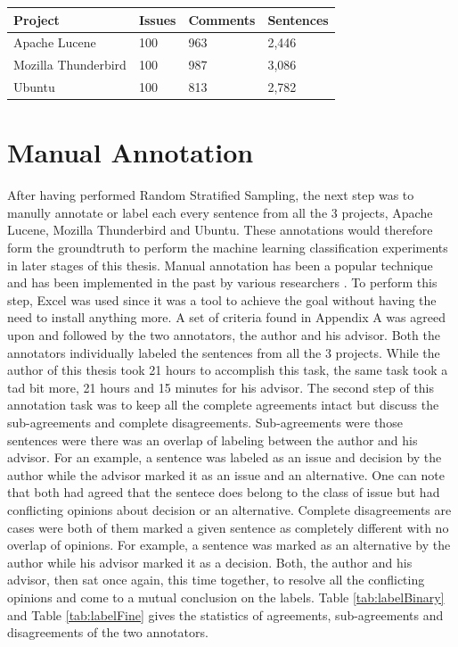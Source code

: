 \documentclass[a4paper,12pt,twoside]{report}
\begin{document}
\begin{table} %
    \centering
    \begin{adjustbox}{max width=\columnwidth}
    \def\arraystretch{1} %
    \begin{tabular}{p{4cm} p{1cm} p{2cm} p{3cm}}
        \toprule
        \textbf{Project} & \textbf{Issues} & \textbf{Comments} & \textbf{Sentences}\\
        \midrule
			Apache Lucene & 100 & 963 & 2,446\\
			Mozilla Thunderbird & 100 & 987 & 3,086\\ 
			Ubuntu & 100 & 813 & 2,782\\
        \midrule
    \end{tabular}
    \end{adjustbox}
    \label{tab:overviewRSS}
\end{table}

\section{Manual Annotation}
After having performed Random Stratified Sampling, the next step was to manully annotate or label each every sentence from all the 3 projects, Apache Lucene, Mozilla Thunderbird and Ubuntu. These annotations would therefore form the groundtruth to perform the machine learning classification experiments in later stages of this thesis. Manual annotation has been a popular technique and has been implemented in the past by various researchers \cite{Alkadhi2017} \cite{Nonnenmacher2017}. 
\bigbreak
To perform this step, Excel was used since it was a tool to achieve the goal without having the need to install anything more. A set of criteria found in Appendix A was agreed upon and followed by the two annotators, the author and his advisor. Both the annotators individually labeled the sentences from all the 3 projects. While the author of this thesis took 21 hours to accomplish this task, the same task took a tad bit more, 21 hours and 15 minutes for his advisor. 
\bigbreak
The second step of this annotation task was to keep all the complete agreements intact but discuss the sub-agreements and complete disagreements. Sub-agreements were those sentences were there was an overlap of labeling between the author and his advisor. For an example, a sentence was labeled as an issue and decision by the author while the advisor marked it as an issue and an alternative. One can note that both had agreed that the sentece does belong to the class of issue but had conflicting opinions about decision or an alternative. Complete disagreements are cases were both of them marked a given sentence as completely different with no overlap of opinions. For example, a sentence was marked as an alternative by the author while his advisor marked it as a decision. Both, the author and his advisor, then sat once again, this time together, to resolve all the conflicting opinions and come to a mutual conclusion on the labels. Table \ref{tab:labelBinary} and Table \ref{tab:labelFine} gives the statistics of agreements, sub-agreements and disagreements of the two annotators. 
\end{document}
